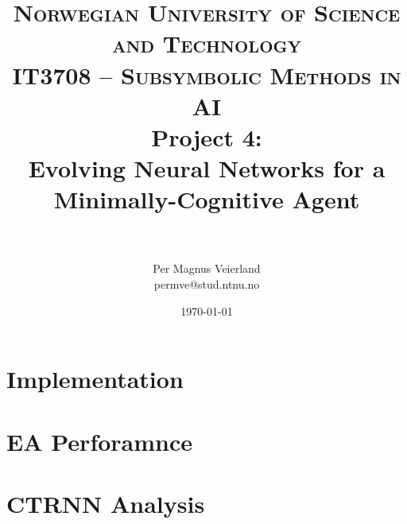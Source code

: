 \documentclass[paper=a4, fontsize=11pt]{scrartcl}
\title{
\normalfont \normalsize
\textsc{Norwegian University of Science and Technology\\IT3708 -- Subsymbolic Methods in AI}
\horrule{0.5pt} \\[0.4cm]
\huge Project 4:\\ Evolving Neural Networks for a Minimally-Cognitive Agent\\
\horrule{2pt} \\[0.5cm]
}
\author{Per Magnus Veierland\\permve@stud.ntnu.no}
\date{\normalsize\today}
\begin{document}
\fancyfoot[C]{}
\maketitle

\newpage
{} %
\setcounter{page}{1}

\section{Implementation}

\section{\ac{EA} Perforamnce}

\section{\acs{CTRNN} Analysis}
\end{document}
